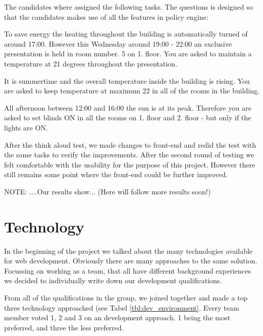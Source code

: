 The candidates where assigned the following tasks. The questions is designed so that the candidates makes use of all the features in policy engine:

\begin{framed}
To save energy the heating throughout the building is automatically turned of around 17:00. However this Wednesday around 19:00 - 22:00 an exclusive presentation is held in room number. 5 on 1. floor.
You are asked to maintain a temperature at 21 degrees throughout the presentation.

\end{framed}


\begin{framed}
It is summertime and the overall temperature inside the building is rising. You are asked to keep temperature at maximum 22 in all of the rooms in the  building.
\end{framed}


\begin{framed}
All afternoon between 12:00 and 16:00 the sun is at its peak. Therefore you are asked to set blinds ON in all the rooms on 1. floor and 2. floor - but only if the lights are ON.
\end{framed}

After the think aloud test, we made changes to front-end and redid the test with the same tasks to verify the improvements. 
After the second round of testing we felt comfortable with the usability for the purpose of this project. However there still remains some point where the front-end could be further improved.

NOTE: ....Our results show... (Here will follow more results soon!)


\section{Technology}
In the beginning of the project we talked about the many technologies available for web development. Obviously there are many approaches to the same solution. Focussing on working as a team, that all have different background experiences we decided to individually write down our development qualifications.

From all of the qualifications in the group, we joined together and made a top three technology approached (see Tabel \ref{tbl:dev_environment}. Every team member voted 1, 2 and 3 on an development approach. 1 being the most preferred, and three the less preferred. 

